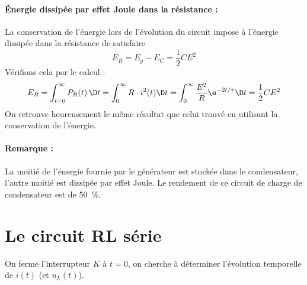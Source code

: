 \documentclass{cours}
\begin{document}
\paragraph{\'Energie dissipée par effet Joule dans la résistance :} La conservation de l'énergie lors de l'évolution du circuit impose à l'énergie dissipée dans la résistance de satisfaire 
\begin{equation*}
\boxed{E_R=E_g-E_C=\dfrac{1}{2}CE^2}
\end{equation*} 
Vérifions cela par le calcul : 
\begin{equation*}
E_R=\displaystyle\int_{t=0}^{\infty}P_R(t)\, \D t=\int_0^{\infty}R\cdot i^2(t) \D t=\int_0^{\infty}\dfrac{E^2}{R}  \e^{-2t/\tau} \D t=\dfrac{1}{2}CE^2
\end{equation*}
On retrouve heureusement le même résultat que celui trouvé en utilisant la conservation de l'énergie. 

\paragraph{Remarque : } La moitié de l'énergie fournie par le générateur est stockée dans le condensateur, l'autre moitié est dissipée par effet Joule. Le rendement de ce circuit de charge de condensateur est de 50~\%.
\section{Le circuit RL série}
\begin{minipage}{5cm}
\end{minipage}%
\begin{minipage}{\linewidth-5cm}
On ferme l'interrupteur $K$ à $t=0$, on cherche à déterminer l'évolution temporelle de $i(t)$ (et $u_L(t)$).
\end{minipage}
\end{document}
